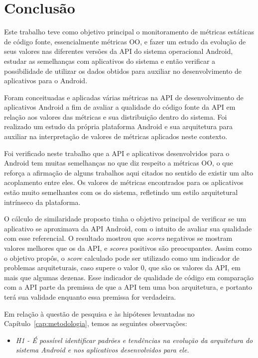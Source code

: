\chapter{Conclusão}
\label{consideracoes-finais}

Este trabalho teve como objetivo principal o monitoramento de métricas estáticas de código fonte, essencialmente métricas OO, e fazer um estudo da evolução de seus valores nas diferentes versões da API do sistema operacional Android, estudar as semelhanças com aplicativos do sistema e então verificar a possibilidade de utilizar os dados obtidos para auxiliar no desenvolvimento de aplicativos para o Android.

Foram conceituadas e aplicadas várias métricas na API de desenvolvimento de aplicativos Android a fim de avaliar a qualidade do código fonte da API em relação aos valores das métricas e sua distribuição dentro do sistema. Foi realizado um estudo da própria plataforma Android e sua arquitetura para auxiliar na interpretação de valores de métricas aplicados neste contexto. 

Foi verificado neste trabalho que a API e aplicativos desenvolvidos para o Android tem muitas semelhanças no que diz respeito a métricas OO, o que reforça a afirmação de alguns trabalhos aqui citados no sentido de existir um alto acoplamento entre eles. Os valores de métricas encontrados para os aplicativos estão muito semelhantes com os do sistema, refletindo um estilo arquitetural intrínseco da plataforma.

O cálculo de similaridade proposto tinha o objetivo principal de verificar se um aplicativo se aproximava da API Android, com o intuito de avaliar sua qualidade com esse referencial. O resultado mostrou que \textit{scores} negativos se mostram valores melhores que os da API, e \textit{scores} positivos são preocupantes. Assim como o objetivo propôs, o \textit{score} calculado pode ser utilizado como um indicador de problemas arquiteturais, caso supere o valor 0, que são os valores da API, em mais que algumas dezenas. Esse indicador de qualidade de código em comparação com a API parte da premissa de que a API tem uma boa arquitetura, e portanto terá sua validade enquanto essa premissa for verdadeira.

Em relação à questão de pesquisa e às hipóteses levantadas no Capítulo~\ref{cap:metodologia}, temos as seguintes observações:

\begin{itemize}
\item \textit{H1 - É possível identificar padrões e tendências na evolução da arquitetura do sistema Android e nos aplicativos desenvolvidos para ele.}
\end{itemize}

